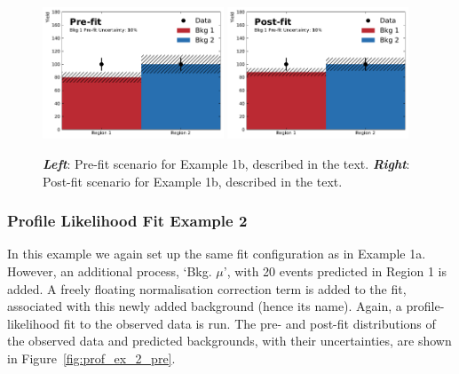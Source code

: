 \begin{figure}[!htb]
    \begin{center}
        \includegraphics[width=0.48\textwidth]{figures/common_ana/stat_hypo/profile_examples/profile_ex_1_NP10_pre}
        \includegraphics[width=0.48\textwidth]{figures/common_ana/stat_hypo/profile_examples/profile_ex_1_NP10_post}
        \caption{
            \textbf{\textit{Left}}: Pre-fit scenario for Example 1b, described in the text.
            \textbf{\textit{Right}}: Post-fit scenario for Example 1b, described in the text.
        }
        \label{fig:prof_ex_1_np10}
    \end{center}
\end{figure}

\subsubsection{Profile Likelihood Fit Example 2}
\label{sec:profiling_example_2}

In this example we again set up the same fit configuration as in Example 1a.
However, an additional process, `Bkg. $\mu$', with 20 events predicted in Region 1 is added.
A freely floating normalisation correction term is added to the fit,
associated with this newly added background (hence its name).
Again, a profile-likelihood fit to the observed data is run.
The pre- and post-fit distributions of the observed data and predicted backgrounds,
with their uncertainties, are shown in Figure~\ref{fig:prof_ex_2_pre}.

